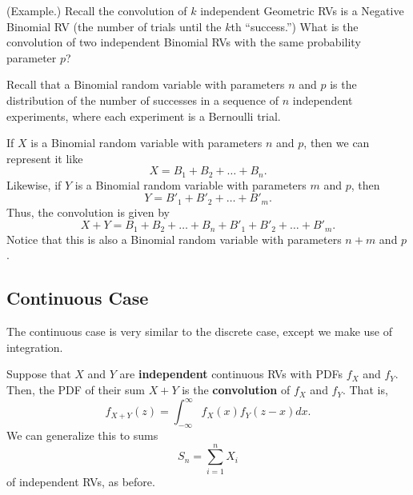 \begin{mdframed}[]
    (Example.) Recall the convolution of $k$ independent Geometric RVs is a Negative Binomial RV (the number of trials until the $k$th ``success.'') What is the convolution of two independent Binomial RVs with the same probability parameter $p$? 

    \begin{mdframed}[]
        Recall that a Binomial random variable with parameters $n$ and $p$ is the distribution of the number of successes in a sequence of $n$ independent experiments, where each experiment is a Bernoulli trial. 

        \bigskip 

        If $X$ is a Binomial random variable with parameters $n$ and $p$, then we can represent it like 
        \[X = B_1 + B_2 + \dots + B_n.\]
        Likewise, if $Y$ is a Binomial random variable with parameters $m$ and $p$, then 
        \[Y = B'_1 + B'_2 + \dots + B'_m.\]
        Thus, the convolution is given by 
        \[X + Y = B_1 + B_2 + \dots + B_n + B'_1 + B'_2 + \dots + B'_m.\]
        Notice that this is also a Binomial random variable with parameters $n + m$ and $p$.
    \end{mdframed}
\end{mdframed}

\subsection{Continuous Case}
The continuous case is very similar to the discrete case, except we make use of integration. 

\begin{theorem}{}{}
    Suppose that $X$ and $Y$ are \textbf{independent} continuous RVs with PDFs $f_X$ and $f_Y$. Then, the PDF of their sum $X + Y$ is the \textbf{convolution} of $f_X$ and $f_Y$. That is, 
    \[f_{X + Y}(z) = \int_{-\infty}^{\infty} f_{X}(x) f_{Y}(z - x) dx.\]
    We can generalize this to sums 
    \[S_n = \sum_{i = 1}^{n} X_i\]
    of independent RVs, as before.
\end{theorem}

